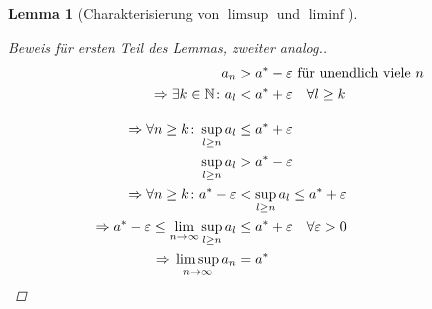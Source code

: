 \documentclass[11pt, twoside, a4paper]{article}
\theoremstyle{plain}
\newtheorem{lemma}[blockelement]{Lemma}
\newcommand{\impl}[0]{\Rightarrow{}}
\newcommand{\fromto}{\rightarrow{}}
\newcommand{\naturalnumbers}{\mathbb{N}}
\begin{document}
\begin{lemma}[Charakterisierung von $\limsup$ und $\liminf$]
\begin{proof}[Beweis für ersten Teil des Lemmas, zweiter analog.]
\begin{align*}
                a_n &> a^{*} - \varepsilon\text{ für unendlich viele $n$}\\
                \impl \exists k\in\naturalnumbers\colon a_l &< a^{*} + \varepsilon\quad\forall l\geq k\\[10pt]
                \impl \forall n\geq k\colon \sup_{l\geq n} a_l &\leq a^{*} + \varepsilon\\
                \sup_{l\geq n} a_l &> a^{*} - \varepsilon\\
                \impl \forall n \geq k\colon a^{*} - \varepsilon &< \sup_{l\geq n} a_l \leq a^{*} + \varepsilon\\
                \impl a^{*} - \varepsilon \leq \lim_{n\fromto\infty} \sup_{l\geq n} a_l &\leq a^{*} + \varepsilon\quad \forall \varepsilon > 0\\
                \impl \limsup_{n\fromto\infty} a_n &= a^{*}\qedhere
            \end{align*}
        \end{proof}
    \end{lemma}
\end{document}
